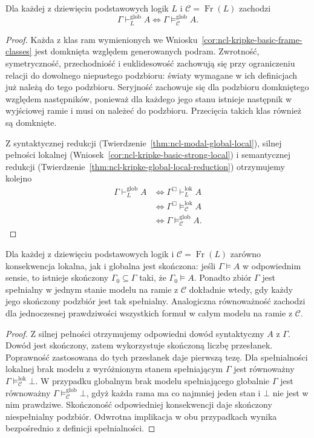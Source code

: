 \begin{twierdzenie}
\label{thm:ncl-kripke-basic-strong-global}
Dla każdej z dziewięciu podstawowych logik
$L$ i $\mathcal C=\operatorname{Fr}(L)$ zachodzi
\[
 \Gamma\vdash_L^{\mathrm{glob}}A
 \iff\Gamma\models_{\mathcal C}^{\mathrm{glob}}A.
\]
\end{twierdzenie}
\begin{proof}
Każda z klas ram wymienionych we
Wniosku~\ref{cor:ncl-kripke-basic-frame-classes}
jest domknięta względem generowanych podram.
Zwrotność, symetryczność, przechodniość
i euklidesowość zachowują się przy ograniczeniu
relacji do dowolnego niepustego podzbioru:
światy wymagane w ich definicjach już należą
do tego podzbioru. Seryjność zachowuje się
dla podzbioru domkniętego względem następników,
ponieważ dla każdego jego stanu istnieje
następnik w wyjściowej ramie i musi on
należeć do podzbioru.
Przecięcia takich klas również są domknięte.

Z syntaktycznej redukcji
(Twierdzenie~\ref{thm:ncl-modal-global-local}),
silnej pełności lokalnej
(Wniosek~\ref{cor:ncl-kripke-basic-strong-local})
i semantycznej redukcji
(Twierdzenie~\ref{thm:ncl-kripke-global-local-reduction})
otrzymujemy kolejno
\[
\begin{aligned}
 \Gamma\vdash_L^{\mathrm{glob}}A
 &\iff\Gamma^\Box\vdash_L^{\mathrm{lok}}A\\
 &\iff\Gamma^\Box\models_{\mathcal C}^{\mathrm{lok}}A\\
 &\iff\Gamma\models_{\mathcal C}^{\mathrm{glob}}A.
\end{aligned}
\]
\end{proof}

\begin{wniosek}
\label{cor:ncl-kripke-basic-compactness}
Dla każdej z dziewięciu podstawowych logik
i $\mathcal C=\operatorname{Fr}(L)$ zarówno
konsekwencja lokalna, jak i globalna jest
skończona: jeśli $\Gamma\models A$ w odpowiednim
sensie, to istnieje skończony
$\Gamma_0\subseteq\Gamma$ taki, że $\Gamma_0\models A$.
Ponadto zbiór $\Gamma$ jest spełnialny
w jednym stanie modelu na ramie z $\mathcal C$
dokładnie wtedy, gdy każdy jego skończony
podzbiór jest tak spełnialny.
Analogiczna równoważność zachodzi dla
jednoczesnej prawdziwości wszystkich formuł
w całym modelu na ramie z $\mathcal C$.
\end{wniosek}
\begin{proof}
Z silnej pełności otrzymujemy odpowiedni dowód
syntaktyczny $A$ z $\Gamma$.
Dowód jest skończony, zatem wykorzystuje
skończoną liczbę przesłanek. Poprawność zastosowana do
tych przesłanek daje pierwszą tezę.
Dla spełnialności lokalnej brak modelu
z wyróżnionym stanem spełniającym $\Gamma$
jest równoważny $\Gamma\models_{\mathcal C}^{\mathrm{lok}}\bot$.
W przypadku globalnym brak modelu spełniającego
globalnie $\Gamma$ jest równoważny
$\Gamma\models_{\mathcal C}^{\mathrm{glob}}\bot$,
gdyż każda rama ma co najmniej jeden stan
i $\bot$ nie jest w nim prawdziwe.
Skończoność odpowiedniej konsekwencji daje
skończony niespełnialny podzbiór.
Odwrotna implikacja w obu przypadkach wynika
bezpośrednio z definicji spełnialności.
\end{proof}


